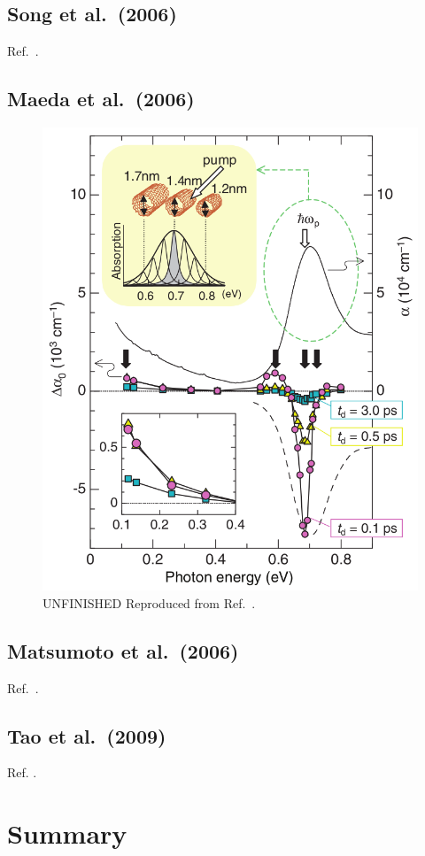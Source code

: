 \subsection{Song et al.\ (2006)}
Ref.\ \cite{song2006optical}.

\subsection{Maeda et al.\ (2006)}

\begin{figure}[ht]
	\centering
	\includegraphics[scale=0.4]{images/chapter_prior_works/stark_shift_maeda}
	\caption{{\color{red} UNFINISHED} Reproduced from Ref.\ \cite{maeda2006gigantic}.}
\end{figure}

\subsection{Matsumoto et al.\ (2006)}

Ref.\ \cite{matsumoto2006optical}.

\subsection{Tao et al.\ (2009)}

Ref. \cite{tao2009subpicosecond}.

\section{Summary}
